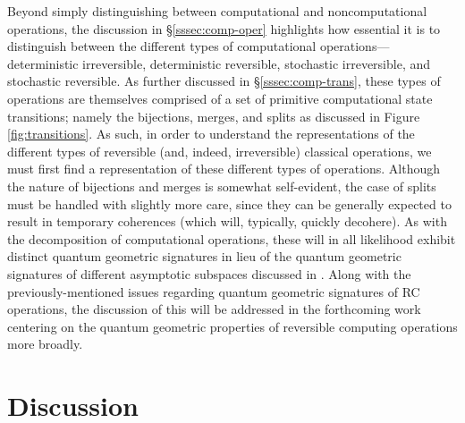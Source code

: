 \documentclass[preprints,article,accept,moreauthors,pdftex]{Definitions/mdpi}
\begin{document}
\begin{paracol}{2}
\switchcolumn

Beyond simply distinguishing between computational and noncomputational operations, the discussion in \S\ref{sssec:comp-oper} highlights how essential it is to distinguish between the different types of computational operations---deterministic irreversible, deterministic reversible, stochastic irreversible, and stochastic reversible. As further discussed in \S\ref{sssec:comp-trans}, these types of operations are themselves comprised of a set of primitive computational state transitions; namely the bijections, merges, and splits as discussed in Figure \ref{fig:transitions}. As such, in order to understand the representations of the different types of reversible (and, indeed, irreversible) classical operations, we must first find a representation of these different types of operations. Although the nature of bijections and merges is somewhat self-evident, the case of splits must be handled with slightly more care, since they can be generally expected to result in temporary coherences (which will, typically, quickly decohere). As with the decomposition of computational operations, these will in all likelihood exhibit distinct quantum geometric signatures in lieu of the quantum geometric signatures of different asymptotic subspaces discussed in \cite{ABFJ16, Albert18}. Along with the previously-mentioned issues regarding quantum geometric signatures of RC operations, the discussion of this will be addressed in the forthcoming work centering on the quantum geometric properties of reversible computing operations more broadly.

\section{Discussion}
\label{sec:disc}


\end{paracol}
\end{document}
